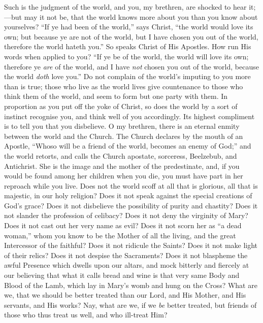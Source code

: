 Such is the judgment of the world, and you, my brethren, are
shocked to hear it;—but may it not be, that the world knows more
about you than you know about yourselves? ``If ye had been of the
world,'' says Christ, ``the world would love its own; but
because ye are not of the world, but I have chosen you out of the
world, therefore the world hateth you.'' So speaks Christ of His
Apostles. How run His words when applied to you? ``If ye be of the
world, the world will love its own; therefore ye \emph{are} of the
world, and I have \emph{not} chosen you out of the world, because the
world \emph{doth} love you.'' Do not complain of the world's
imputing to you more than is true; those who live as the world lives
give countenance to those who think them of the world, and seem to
form but one party with them. In proportion as you put off the yoke
of
Christ, so does the world by a sort of instinct recognise you, and
think well of you accordingly. Its highest compliment is to tell you
that you disbelieve. O my brethren, there is an eternal enmity between
the world and the Church. The Church declares by the mouth of an
Apostle, ``Whoso will be a friend of the world, becomes an enemy
of God;'' and the world retorts, and calls the Church apostate,
sorceress, Beelzebub, and Antichrist. She is the image and the mother
of the predestinate, and, if you would be found among her children
when you die, you must have part in her reproach while you live. Does
not the world scoff at all that is glorious, all that is majestic, in
our holy religion? Does it not speak against the special creations of
God's grace? Does it not disbelieve the possibility of purity and
chastity? Does it not slander the profession of celibacy? Does it not
deny the virginity of Mary? Does it not cast out her very name as
evil? Does it not scorn her as ``a dead woman,'' whom you know
to be the Mother of all the living, and the great Intercessor of the
faithful? Does it not ridicule the Saints? Does it not make light of
their relics? Does it not despise the Sacraments? Does it not
blaspheme the awful Presence which dwells upon our altars, and mock
bitterly and fiercely at our believing that what it calls bread and
wine is that very same Body and Blood of the Lamb, which lay in Mary's
womb and hung on the Cross? What are we, that we should be better
treated than our Lord, and His Mother, and His servants, and His
works? Nay, what are we, if we \emph{be} better treated, but friends
of those who thus treat us well, and who ill-treat Him?


